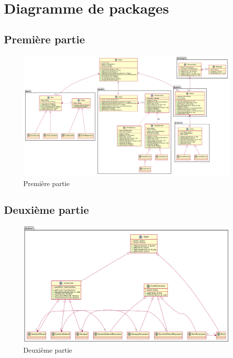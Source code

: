 \section{Diagramme de packages}
\subsection{Première partie}
	\vspace{10mm}
	\begin{figure}[!h]
		\centering
		\includegraphics[scale=0.3]{images/DP1.png}
		\caption{Première partie}
	\end{figure}

\subsection{Deuxième partie}
	\vspace{10mm}
	\begin{figure}[!h]
		\centering
		\includegraphics[scale=0.3]{images/DP2.png}
		\caption{Deuxième partie}
	\end{figure}

